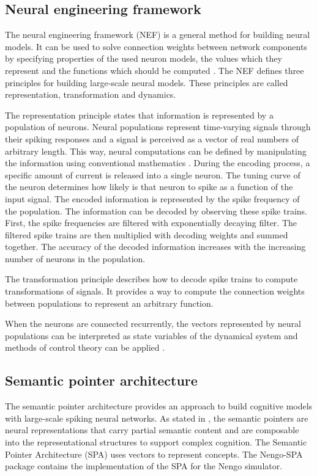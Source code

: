 \subsection{Neural engineering framework}
The neural engineering framework (NEF) is a general method for building neural models. It can be used to solve connection weights between network components by specifying properties of the used neuron models, the values which they represent and the functions which should be computed \cite{stewartTechnicalOverviewNeural2012}. The NEF defines three principles for building large-scale neural models. These principles are called representation, transformation and dynamics. \par
The representation principle states that information is represented by a population of neurons. Neural populations represent time-varying signals through their spiking responses and a signal is perceived as a vector of real numbers of arbitrary length.  This way, neural computations can be defined by manipulating the information using conventional mathematics \cite{bekolayNengoPythonTool2014}. During the encoding process, a specific amount of current is released into a single neuron. The tuning curve of the neuron determines how likely is that neuron to spike as a function of the input signal. The encoded information is represented by the spike frequency of the population. The information can be decoded by observing these spike trains. First, the spike frequencies are filtered with exponentially decaying filter. The filtered spike trains are then multiplied with decoding weights and summed together. The accuracy of the decoded information increases with the increasing number of neurons in the population. \par
The transformation principle describes how to decode spike trains to compute transformations of signals. It provides a way to compute the connection weights between populations to represent an arbitrary function. \par
When the neurons are connected recurrently, the vectors represented by neural populations can be interpreted as state variables of the dynamical system and methods of control theory can be applied \cite{bekolayNengoPythonTool2014}.

\subsection{Semantic pointer architecture}
The semantic pointer architecture provides an approach to build cognitive models with large-scale spiking neural networks. As stated in \cite{eliasmithHowBuild13}, the semantic pointers are neural representations that carry partial semantic content and are composable into the representational structures to support complex cognition. The Semantic Pointer Architecture (SPA) uses vectors to represent concepts. The Nengo-SPA package contains the implementation of the SPA for the Nengo simulator.

